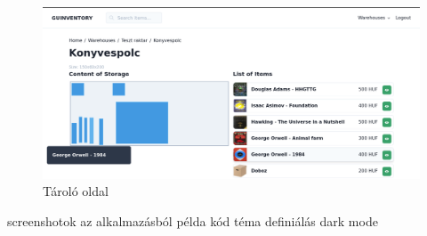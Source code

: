 \begin{figure}[!ht]
  \centering
  \includegraphics[width=150mm, keepaspectratio]{figures/storage.png}
  \caption{Tároló oldal}
  \label{fig:storage}
\end{figure}

screenshotok az alkalmazásból
példa kód
téma definiálás
dark mode

